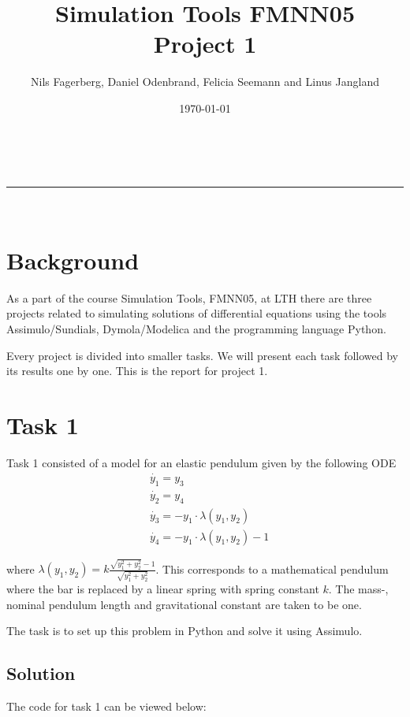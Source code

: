 \documentclass[a4paper,11pt]{article}
\makeatletter
\newcommand{\linia}{\rule{\linewidth}{0.5pt}}
\theoremstyle{mytheor}
\renewcommand{\maketitle}{
\begin{center}
\vspace{2ex}
{\huge \textsc{\@title}}
\vspace{1ex}
\\
\linia\\
\@author \hfill \@date
\vspace{4ex}
\end{center}
}
\makeatother
\begin{document}
\title{Simulation Tools FMNN05 \\Project 1}

\author{Nils Fagerberg, Daniel Odenbrand, Felicia Seemann and Linus Jangland}

\date{\today}

\maketitle

\section*{Background}
As a part of the course Simulation Tools, FMNN05, at LTH there are three projects related to simulating solutions of differential equations using the tools Assimulo/Sundials, Dymola/Modelica and the programming language Python. 

Every project is divided into smaller tasks. We will present each task followed by its results one by one. This is the report for project 1.

\section*{Task 1}
Task 1 consisted of a model for an elastic pendulum given by the following ODE
\begin{align}
& \dot{y_1} = y_3 \\
& \dot{y_2} = y_4 \\
& \dot{y_3} = -y_1 \cdot \lambda (y_1, y_2) \\
& \dot{y_4} = -y_1 \cdot \lambda (y_1, y_2)  - 1
\end{align}

where $\lambda (y_1, y_2) = k \frac{\sqrt{y_1^2 + y_2^2} - 1}{\sqrt{y_1^2 + y_2^2}}$. This corresponds to a mathematical pendulum where the bar is replaced by a linear spring with spring constant $k$. The mass-, nominal pendulum length and gravitational constant are taken to be one.

The task is to set up this problem in Python and solve it using Assimulo.

\subsection*{Solution}
The code for task 1 can be viewed below:
\end{document}
